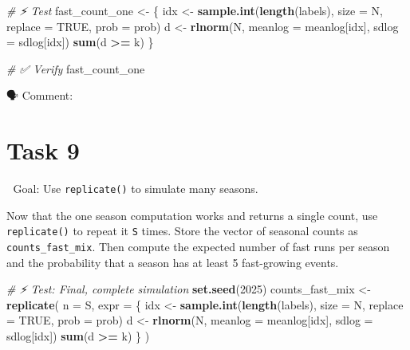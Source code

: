 \documentclass[
  12pt,
]{scrreprt}
\newenvironment{Shaded}{\begin{snugshade}}{\end{snugshade}}
\newcommand{\AttributeTok}[1]{\textcolor[rgb]{0.13,0.29,0.53}{#1}}
\newcommand{\CommentTok}[1]{\textcolor[rgb]{0.56,0.35,0.01}{\textit{#1}}}
\newcommand{\ConstantTok}[1]{\textcolor[rgb]{0.56,0.35,0.01}{#1}}
\newcommand{\DecValTok}[1]{\textcolor[rgb]{0.00,0.00,0.81}{#1}}
\newcommand{\FunctionTok}[1]{\textcolor[rgb]{0.13,0.29,0.53}{\textbf{#1}}}
\newcommand{\NormalTok}[1]{#1}
\newcommand{\OtherTok}[1]{\textcolor[rgb]{0.56,0.35,0.01}{#1}}
\newcommand{\SpecialCharTok}[1]{\textcolor[rgb]{0.81,0.36,0.00}{\textbf{#1}}}
\begin{document}
\begin{Shaded}
\begin{Highlighting}[]
\CommentTok{\# ⚡ Test}
\NormalTok{fast\_count\_one }\OtherTok{\textless{}{-}}\NormalTok{ \{}
\NormalTok{  idx }\OtherTok{\textless{}{-}} \FunctionTok{sample.int}\NormalTok{(}\FunctionTok{length}\NormalTok{(labels),}
                    \AttributeTok{size    =}\NormalTok{ N,}
                    \AttributeTok{replace =} \ConstantTok{TRUE}\NormalTok{,}
                    \AttributeTok{prob    =}\NormalTok{ prob)}
\NormalTok{  d   }\OtherTok{\textless{}{-}} \FunctionTok{rlnorm}\NormalTok{(N,}
                \AttributeTok{meanlog =}\NormalTok{ meanlog[idx],}
                \AttributeTok{sdlog   =}\NormalTok{ sdlog[idx])}
  \FunctionTok{sum}\NormalTok{(d }\SpecialCharTok{\textgreater{}=}\NormalTok{ k)}
\NormalTok{\}}
\end{Highlighting}
\end{Shaded}

\begin{Shaded}
\begin{Highlighting}[]
\CommentTok{\# ✅  Verify}
\NormalTok{fast\_count\_one}
\end{Highlighting}
\end{Shaded}

🗣 Comment:

\section{Task 9}\label{task-9}

🎯 Goal: Use \texttt{replicate()} to simulate many seasons.

Now that the one season computation works and returns a single count, use \texttt{replicate()} to repeat it \texttt{S} times. Store the vector of seasonal counts as \texttt{counts\_fast\_mix}. Then compute the expected number of fast runs per season and the probability that a season has at least 5 fast-growing events.

\begin{Shaded}
\begin{Highlighting}[]
\CommentTok{\# ⚡ Test: Final, complete simulation}
\FunctionTok{set.seed}\NormalTok{(}\DecValTok{2025}\NormalTok{)}
\NormalTok{counts\_fast\_mix }\OtherTok{\textless{}{-}} \FunctionTok{replicate}\NormalTok{(}
  \AttributeTok{n =}\NormalTok{ S,}
  \AttributeTok{expr =}\NormalTok{ \{}
\NormalTok{    idx }\OtherTok{\textless{}{-}} \FunctionTok{sample.int}\NormalTok{(}\FunctionTok{length}\NormalTok{(labels), }\AttributeTok{size =}\NormalTok{ N, }\AttributeTok{replace =} \ConstantTok{TRUE}\NormalTok{, }\AttributeTok{prob =}\NormalTok{ prob)}
\NormalTok{    d   }\OtherTok{\textless{}{-}} \FunctionTok{rlnorm}\NormalTok{(N, }\AttributeTok{meanlog =}\NormalTok{ meanlog[idx], }\AttributeTok{sdlog =}\NormalTok{ sdlog[idx])}
    \FunctionTok{sum}\NormalTok{(d }\SpecialCharTok{\textgreater{}=}\NormalTok{ k)}
\NormalTok{  \}}
\NormalTok{)}
\end{Highlighting}
\end{Shaded}
\end{document}
